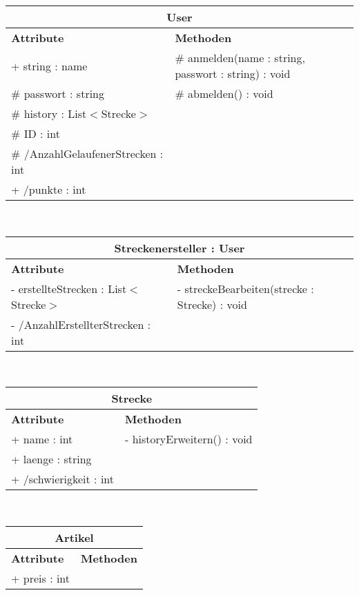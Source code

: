 \documentclass[a4paper, 12pt]{article}
\begin{document}
\begin{tabular}{ | p{5.5cm} | p{8cm} |}
\multicolumn{2}{c}{\textbf{User}}\\ \hline
\textbf{Attribute} & \textbf{Methoden} \\ \hline
+ string : name & \# anmelden(name : string, passwort : string) : void \\ \hline
\# passwort : string & \# abmelden() : void  \\ \hline
\# history : List$<$Strecke$>$ &  \\ \hline
\# ID : int &  \\ \hline
\# /AnzahlGelaufenerStrecken : int &  \\ \hline
+ /punkte : int & \\ \hline
\end{tabular}\\[1\baselineskip]

\begin{tabular}{ | p{5.5cm} | p{8cm} |}
\multicolumn{2}{c}{\textbf{Streckenersteller : User}}\\ \hline
\textbf{Attribute} & \textbf{Methoden} \\ \hline
- erstellteStrecken : List$<$Strecke$>$ & - streckeBearbeiten(strecke : Strecke) : void  \\ \hline
- /AnzahlErstellterStrecken : int & \\ \hline
\end{tabular}\\[1\baselineskip]

\begin{tabular}{ | p{5.5cm} | p{8cm} |}
\multicolumn{2}{c}{\textbf{Strecke}}\\ \hline
\textbf{Attribute} & \textbf{Methoden} \\ \hline
+ name : int & - historyErweitern() : void \\ \hline
+ laenge : string &  \\ \hline
+ /schwierigkeit : int &  \\ \hline
\end{tabular}\\[1\baselineskip]

\begin{tabular}{ | p{5.5cm} | p{8cm} |}
\multicolumn{2}{c}{\textbf{Artikel}}\\ \hline
\textbf{Attribute} & \textbf{Methoden} \\ \hline
+ preis : int &  \\ \hline
\end{tabular}\\[1\baselineskip]
\end{document}
